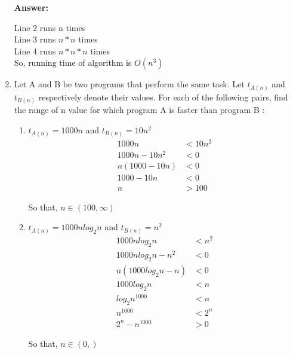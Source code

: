 \documentclass[a4paper]{article}
\begin{document}
\begin{enumerate}[label=(\alph*)]
     \textbf{Answer:}
     
     \*Line 2 runs n times
     \\Line 3 runs $n * n$ times
     \\Line 4 runs $n * n * n$ times
     \\So, running time of algorithm is {$ O(n^3) $}
     
     \vspace{0.5cm}
     \item  Let A and B be two programs that perform the same task. Let {$ t_{A(n)} $} and {$ t_{B(n)} $} respectively denote their values. For each of the following pairs, find the range of n value for which program A is faster than program B :
     
     \begin{enumerate}[label=(\roman*)]
         \item {$t_{A(n)} = 1000n $} and {$ t_{B(n)} = 10n^2 $}
         \begin{align*}
             1000n &< 10n^2 \\
             1000n - 10n^2 &< 0 \\
             n(1000 - 10n) &< 0 \\
             1000 - 10n &< 0 \\
             n &> 100
         \end{align*}
         \begin{changemargin}{0.8cm}{0cm}
             So that, $ n \in (100, \infty) $
         \end{changemargin}
         
         \vspace{0.5cm}
         \item {$t_{A(n)} = 1000n log_2 n $} and {$ t_{B(n)} = n^2 $}
         \begin{align*}
             1000n log_2 n &< n^2 \\
             1000n log_2 n - n^2 &< 0 \\
             n(1000 log_2 n - n) &< 0 \\
             1000 log_2 n &< n \\
             log_2 n^{1000} &< n \\
             n^{1000} &< 2^n \\
             2^n - n^{1000} &> 0
         \end{align*}
         \begin{changemargin}{0.8cm}{0cm}
             So that, $ n \in  (0, ) $
         \end{changemargin}
         

\end{enumerate}
\end{enumerate}
\end{document}
